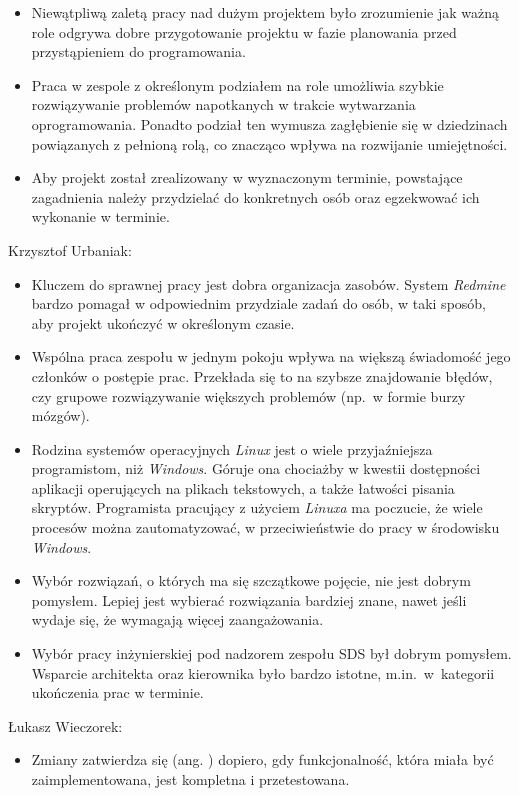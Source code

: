 \begin{description}
\begin{itemize}
\item Niewątpliwą zaletą pracy nad dużym projektem było zrozumienie jak ważną role odgrywa dobre przygotowanie projektu w fazie planowania przed przystąpieniem do programowania.
\item Praca w zespole z określonym podziałem na role umożliwia szybkie rozwiązywanie problemów napotkanych w trakcie wytwarzania oprogramowania. Ponadto podział ten wymusza zagłębienie się w dziedzinach powiązanych z pełnioną rolą, co znacząco wpływa na rozwijanie umiejętności.
\item Aby projekt został zrealizowany w wyznaczonym terminie, powstające zagadnienia należy przydzielać do konkretnych osób oraz egzekwować ich wykonanie w terminie.
\end{itemize}
\item Krzysztof Urbaniak:
\begin{itemize}
\item Kluczem do sprawnej pracy jest dobra organizacja zasobów. System \textit{Redmine} bardzo pomagał w odpowiednim przydziale zadań do osób, w taki sposób, aby projekt ukończyć w określonym czasie.
\item Wspólna praca zespołu w jednym pokoju wpływa na większą świadomość jego członków o postępie prac. Przekłada się to na szybsze znajdowanie błędów, czy grupowe rozwiązywanie większych problemów (np.~w formie burzy mózgów).
\item Rodzina systemów operacyjnych \textit{Linux} jest o wiele przyjaźniejsza programistom, niż \textit{Windows}. Góruje ona chociażby w kwestii dostępności aplikacji operujących na plikach tekstowych, a także łatwości pisania skryptów. Programista pracujący z użyciem \textit{Linuxa} ma poczucie, że wiele procesów można zautomatyzować, w przeciwieństwie do pracy w środowisku \textit{Windows}.
\item Wybór rozwiązań, o których ma się szczątkowe pojęcie, nie jest dobrym pomysłem. Lepiej jest wybierać rozwiązania bardziej znane, nawet jeśli wydaje się, że wymagają więcej zaangażowania.
\item Wybór pracy inżynierskiej pod nadzorem zespołu SDS był dobrym pomysłem. Wsparcie architekta oraz kierownika było bardzo istotne, m.in.~w~kategorii ukończenia prac w terminie.
\end{itemize}
\item Łukasz Wieczorek:
\begin{itemize}
\item Zmiany zatwierdza się (ang. ) dopiero, gdy funkcjonalność, która miała być zaimplementowana, jest kompletna i przetestowana.

\end{itemize}
\end{description}
